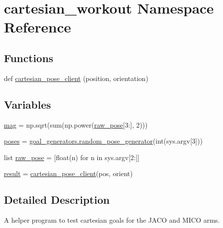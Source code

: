 \hypertarget{namespacecartesian__workout}{}\section{cartesian\+\_\+workout Namespace Reference}
\label{namespacecartesian__workout}
\subsection*{Functions}
\begin{DoxyCompactItemize}
\item 
def \hyperlink{namespacecartesian__workout_a1fb7cd9a49c4af0ae2cf8cab45335d40}{cartesian\+\_\+pose\+\_\+client} (position, orientation)
\end{DoxyCompactItemize}
\subsection*{Variables}
\begin{DoxyCompactItemize}
\item 
\hyperlink{namespacecartesian__workout_a9cc10da8ef79d18715644543b9794d80}{mag} = np.\+sqrt(sum(np.\+power(\hyperlink{namespacecartesian__workout_a967ea83284096aa4c94c0b41daa5df6c}{raw\+\_\+pose}\mbox{[}3\+:\mbox{]}, 2)))
\item 
\hyperlink{namespacecartesian__workout_ab293192d190a24c9cb8edbea4ef33862}{poses} = \hyperlink{namespacegoal__generators_acc20fd60c84b4f30491d22bf16139668}{goal\+\_\+generators.\+random\+\_\+pose\+\_\+generator}(int(sys.\+argv\mbox{[}3\mbox{]}))
\item 
list \hyperlink{namespacecartesian__workout_a967ea83284096aa4c94c0b41daa5df6c}{raw\+\_\+pose} = \mbox{[}float(n) for n in sys.\+argv\mbox{[}2\+:\mbox{]}\mbox{]}
\item 
\hyperlink{namespacecartesian__workout_ac2ac6ec3a92f53155c4912cbf5c93604}{result} = \hyperlink{namespacecartesian__workout_a1fb7cd9a49c4af0ae2cf8cab45335d40}{cartesian\+\_\+pose\+\_\+client}(pos, orient)
\end{DoxyCompactItemize}


\subsection{Detailed Description}
\begin{DoxyVerb}A helper program to test cartesian goals for the JACO and MICO arms.\end{DoxyVerb}
 

